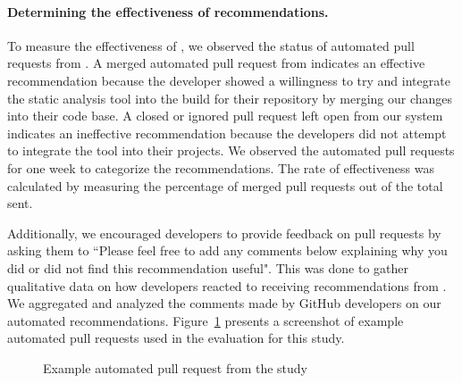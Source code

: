 \paragraph{Determining the effectiveness of recommendations.}

To measure the effectiveness of \tele, we observed the status of automated pull requests from \tool. A merged automated pull request from \tool indicates an effective recommendation because the developer showed a willingness to try \EP and integrate the static analysis tool  into the build for their repository by merging our changes into their code base. A closed or ignored pull request left open from our system indicates an ineffective recommendation because the developers did not attempt to integrate the tool into their projects. We observed the automated pull requests for one week to categorize the recommendations. The rate of effectiveness was calculated by measuring the percentage of merged pull requests out of the total sent.

Additionally, we encouraged developers to provide feedback on pull requests by asking them to ``Please feel free to add any comments below explaining why you did or did not find this recommendation useful". This was done to gather qualitative data on how developers reacted to receiving \tele recommendations from \tool. We aggregated and analyzed the comments made by GitHub developers on our automated recommendations. Figure~\ref{fig:botse} presents a screenshot of example automated pull requests used in the evaluation for this study.

\begin{figure}[]
\centering
{}
\caption{Example automated pull request from the \sorry study}
\label{fig:botse}
\end{figure}

